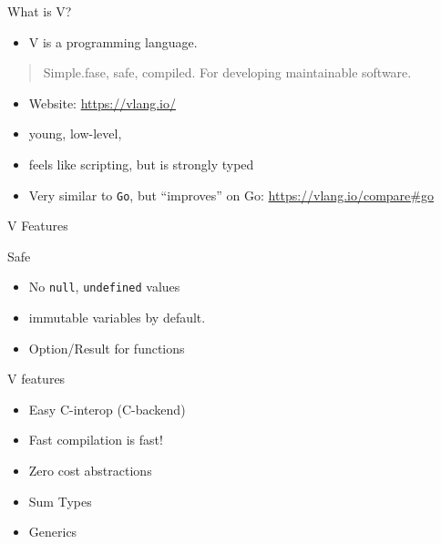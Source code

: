 \documentclass[
  ignorenonframetext,
]{beamer}
\providecommand{\tightlist}{%
  \setlength{\itemsep}{0pt}\setlength{\parskip}{0pt}}
\begin{document}
\begin{frame}[fragile]{What is V?}
\protect\hypertarget{what-is-v}{}
\begin{itemize}
\tightlist
\item
  V is a programming language.
\end{itemize}

\begin{quote}
Simple.fase, safe, compiled. For developing maintainable software.
\end{quote}

\begin{itemize}
\tightlist
\item
  Website: \url{https://vlang.io/}
\item
  young, low-level,
\item
  feels like scripting, but is strongly typed
\item
  Very similar to \texttt{Go}, but ``improves'' on Go:
  \url{https://vlang.io/compare\#go}
\end{itemize}
\end{frame}

\begin{frame}[fragile]{V Features}
\protect\hypertarget{v-features}{}
\begin{block}{Safe}
\protect\hypertarget{safe}{}
\begin{itemize}
\tightlist
\item
  No \texttt{null}, \texttt{undefined} values
\item
  immutable variables by default.
\item
  Option/Result for functions
\end{itemize}
\end{block}

\begin{block}{V features}
\protect\hypertarget{v-features-1}{}
\begin{itemize}
\tightlist
\item
  Easy C-interop (C-backend)
\item
  Fast compilation is fast!
\item
  Zero cost abstractions
\item
  Sum Types
\item
  Generics
\end{itemize}
\end{block}
\end{frame}
\end{document}
